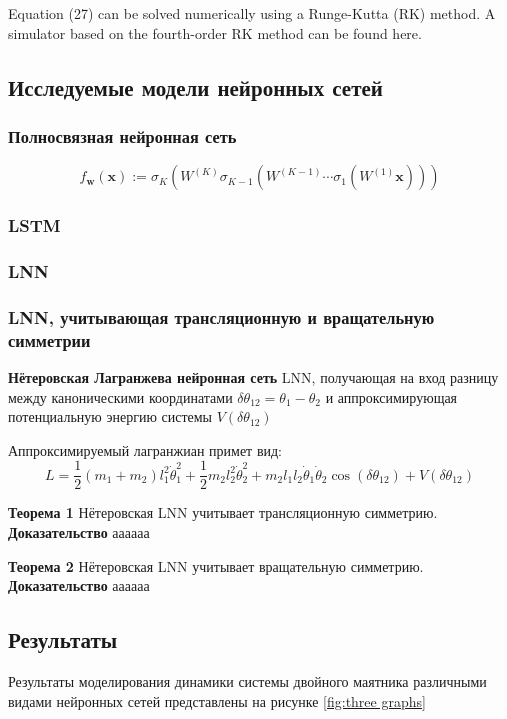 \documentclass[12pt]{article}
\begin{document}
	Equation (27) can be solved numerically using a Runge-Kutta (RK) method. A simulator based on the fourth-order RK method can be found here.
	
	\subsection{Исследуемые модели нейронных сетей}
	\subsubsection{Полносвязная нейронная сеть}
	\begin{equation}
	f_{\boldsymbol{w}}(\boldsymbol{x}):=\sigma_{K}\left(W^{(K)} \sigma_{K-1}\left(W^{(K-1)} \cdots \sigma_{1}\left(W^{(1)} \boldsymbol{x}\right)\right)\right)
	\end{equation}
	
	\subsubsection{LSTM}
	\subsubsection{LNN}
	\subsubsection{LNN, учитывающая трансляционную и вращательную симметрии}
	\textbf{Нётеровская Лагранжева нейронная сеть}
	LNN, получающая на вход разницу между каноническими координатами $\delta \theta_{12} = \theta_1-\theta_2$ и аппроксимирующая потенциальную энергию системы $V(\delta \theta_{12})$
	
	
	Аппроксимируемый лагранжиан примет вид:
	$$
	L=\frac{1}{2}\left(m_{1}+m_{2}\right) l_{1}^{2} \dot{\theta}_{1}^{2} +\frac{1}{2} m_{2} l_{2}^{2} \dot{\theta}_{2}^{2}+m_{2} l_{1} l_{2} \dot{\theta}_{1} \dot{\theta}_{2} \cos \left(\delta \theta_{12}\right) + V(\delta \theta_{12})
	$$
	
	\textbf{Теорема 1}
	Нётеровская LNN учитывает трансляционную симметрию.
	\textbf{Доказательство}
	аааааа
	
	\textbf{Теорема 2}
	Нётеровская LNN учитывает вращательную симметрию.
	\textbf{Доказательство}
	аааааа

	\subsection{Результаты}
	Результаты моделирования динамики системы двойного маятника различными видами нейронных сетей представлены на рисунке \ref{fig:three graphs}
	
\end{document}
